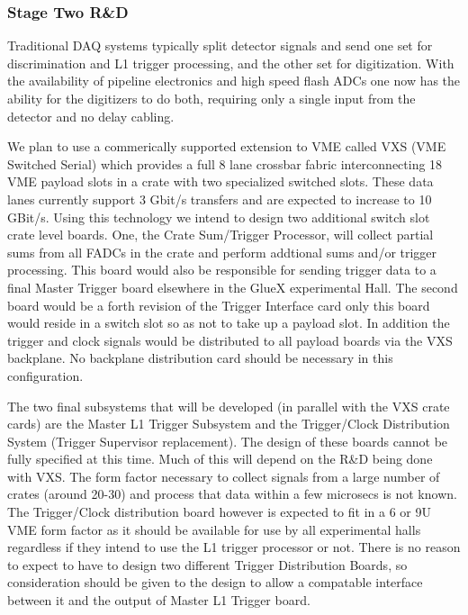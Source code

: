 \documentclass[10pt]{article}
\begin{document}
\subsubsection*{Stage Two R\&D}

Traditional DAQ systems typically split detector signals and send one set for
discrimination and L1 trigger processing, and the other set for digitization. With
the availability of pipeline electronics and high speed flash ADCs one now has
the ability for the digitizers to do both, requiring only a single input
from the detector and no delay cabling. 

We plan to use a commerically supported extension to VME called VXS (VME Switched Serial)
which provides a full 8 lane crossbar fabric interconnecting 18 VME payload slots in a crate 
with two specialized switched slots. These data lanes currently support 3 Gbit/s transfers
and are expected to increase to 10 GBit/s. Using this technology we intend to design two
additional switch slot crate level boards. One, the Crate Sum/Trigger Processor, will collect
partial sums from all FADCs in the crate and perform addtional sums and/or trigger processing.
This board would also be responsible for sending trigger data to a final Master Trigger board
elsewhere in the GlueX experimental Hall. The second board would be a forth revision of the
Trigger Interface card only this board would reside in a switch slot so as not to take up a 
payload slot. In addition the trigger and clock signals would be distributed to all payload
boards via the VXS backplane. No backplane distribution card should be necessary in this
configuration.

The two final subsystems that will be developed (in parallel with the VXS crate cards) are the
Master L1 Trigger Subsystem and the Trigger/Clock Distribution System (Trigger Supervisor
replacement). The design of these boards cannot be fully specified at this time. Much of this
will depend on the R\&D being done with VXS. The form factor necessary to collect signals from
a large number of crates (around 20-30) and process that data within a few microsecs is not
known. The Trigger/Clock distribution board however is expected to fit in a 6 or 9U VME form factor
as it should be available for use by all experimental halls regardless if they intend to 
use the L1 trigger processor or not. There is no reason to expect to have to design two different
Trigger Distribution Boards, so consideration should be given to the design to allow a 
compatable interface between it and the output of Master L1 Trigger board.
\end{document}
